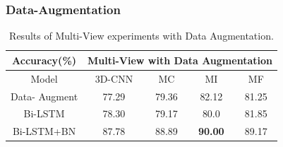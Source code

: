\subsubsection{Data-Augmentation}
\begin{table}[h]
	\centering
	\begin{tabular}{c|cccc}
		\multicolumn{1}{c|}{Accuracy(\%)} &%
		\multicolumn{4}{c}{Multi-View with Data Augmentation}\\ \hline
		Model&%
		3D-CNN & MC & MI & MF \\\hline
		Data- Augment%
		& %
		77.29 & 79.36& 82.12& 81.25\\
		Bi-LSTM%
		& %
		78.30 & 79.17& 80.0& 81.85\\
		Bi-LSTM+BN%
		& %
		87.78& 88.89& \textbf{90.00}& 89.17\\
	\end{tabular}
	\caption{Results of Multi-View experiments with Data Augmentation.}
	\label{tab:multitbaug}
\end{table}


